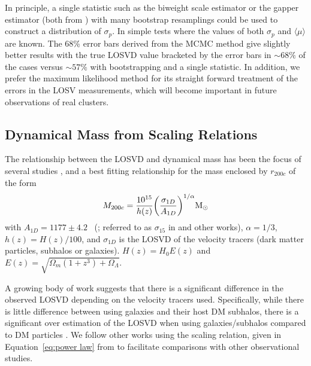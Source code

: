 \documentclass[fleqn,usenatbib]{mnras}
\newcommand{\editorial}[1]{\textcolor{red}{#1}}
\begin{document}
In principle, a single statistic such as the biweight scale estimator or the gapper estimator (both from \citealt{Beers1990}) with many bootstrap resamplings could be used to construct a distribution of $\sigma_p$. In simple tests where the values of both $\sigma_p$ and $\langle\mu\rangle$ are known. The 68\% error bars derived from the MCMC method give slightly better results with the true LOSVD value bracketed by the error bars in $\sim68\%$ of the cases versus $\sim57\%$ with bootstrapping and a single statistic. In addition, we prefer the maximum likelihood method for its straight forward treatment of the errors in the LOSV measurements, which will become important in future observations of real clusters.

\subsection{Dynamical Mass from Scaling Relations}\label{sec: mass}
The relationship between the LOSVD and dynamical mass has been the focus of several studies , and a best fitting relationship for the mass enclosed by $r_{200c}$ of the form
\begin{equation}\label{eq:power law}
	M_{200c} = \frac{10^{15}}{h(z)} \bigg{(}\frac{\sigma_{1D}}{A_{1D}} \bigg{)}^{1/\alpha} \hbox{$\mathrm{M}_\odot$}
\end{equation}
with $A_{1D} = 1177 \pm 4.2$ \kms\ (\citealt{Munari2013}; referred to as $\sigma_{15}$ in \citealt{Evrard2008} and other works), $\alpha = 1/3$, $h(z) = H(z)/100$, and $\sigma_{1D}$ is the LOSVD of the velocity tracers (dark matter particles, subhalos or galaxies). $H(z) = H_0 E(z)$ and $E(z) = \sqrt{\Omega_m(1+z^3)+\Omega_{\Lambda}}$.

A growing body of work suggests that there is a significant difference in the observed LOSVD depending on the velocity tracers used. Specifically, while there is little difference between using galaxies and their host DM subhalos, there is a significant over estimation of the LOSVD when using galaxies/subhalos compared to DM particles \citep{Munari2013}. We follow other works  using the scaling relation, given in Equation~\ref{eq:power law} from \cite{Munari2013} to facilitate comparisons with other observational studies. 
\end{document}

